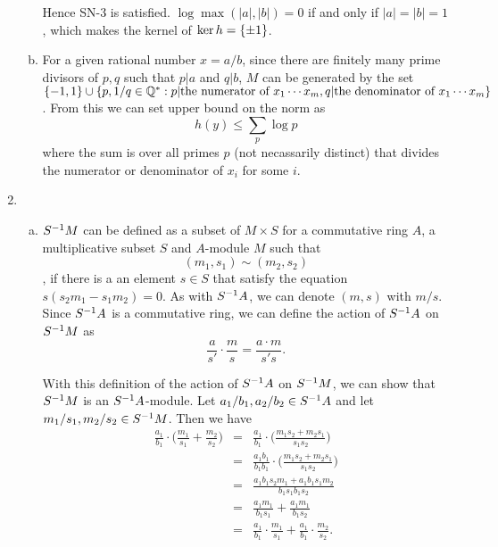 \documentclass{article}
\theoremstyle{definition}
\theoremstyle{remark}
\begin{document}
\begin{enumerate}[(1)]
\begin{enumerate}[(a)]
        \newcommand{\QQ}{\mathbb{Q}}
            Hence SN-3 is satisfied. $\log \max(|a|, |b|) = 0$ if and only if $|a| = |b| = 1$, which makes the kernel of $\ker h = \{\pm 1\}$.
          \item  For a given rational number $x = a/b$, since there are finitely many prime divisors of $p, q$ such that $p | a$ and $q | b$, $M$ can be generated by the set $\set{-1, 1} \cup \set{p, 1/q \in \QQ^* : p | \text{the numerator of } x_1 \cdots x_m, q | \text{the denominator of } x_1 \cdots x_m }$. From this we can set upper bound on the norm as
                $$h(y) \leq \sum_{p} \log p$$
          where the sum is over all primes $p$ (not necassarily distinct) that divides the numerator or denominator of $x_i$ for some $i$.
       \end{enumerate}
  \item
        \begin{enumerate}[(a)]
          \item ${S}^{-1}M$ can be defined as a subset of $M \times S$  for a commutative ring $A$, a multiplicative subset $S$ and $A$-module $M$ such that
                $$(m_1, s_1) \sim (m_2, s_2)$$,
                if there is a an element $s \in S$ that satisfy the equation $s(s_2m_1 - s_1m_2) = 0$. As with ${S}^{-1}A$, we can denote $(m, s)$ with $m/s.$
                Since ${S}^{-1}A$ is a commutative ring, we can define the action of ${S}^{-1}A$ on ${S}^{-1}M$ as
                $$\frac{a}{s'}\cdot \frac{m}s = \frac{a \cdot m}{s' s}.$$

                With this definition of the action of ${S}^{-1}A$  on ${S}^{-1}M$, we can show that ${S}^{-1}M$ is an ${S}^{-1}A$-module. Let $a_1/b_1, a_2/b_2 \in {S}^{-1}A$ and let $m_1/s_1, m_2/s_2 \in {S}^{-1}M$. Then we have
                \begin{eqnarray*}
                  \frac{a_1}{b_1} \cdot \bigg( \frac{m_1}{s_1} + \frac{m_2}{s_2}  \bigg) & = &  \frac{a_1}{b_1} \cdot \bigg( \frac{m_1s_2 + m_2s_1}{s_1s_2} \bigg)\\
                                                                                          & = & \frac{a_1b_1}{b_1b_1} \cdot \bigg(\frac {m_1s_2 + m_2s_1}{s_1s_2} \bigg) \\
                                                                                          & = &  \frac{a_1b_1s_2m_1 + a_1b_1s_1m_2}{b_1s_1b_1s_2} \\
                                                                                          & = &  \frac{a_1m_1}{b_1s_1} + \frac{a_1m_1}{b_1s_2} \\
                                                                                          & = &  \frac{a_1}{b_1}\cdot \frac{m_1}{s_1} + \frac{a_1}{b_1}\cdot \frac{m_2}{s_2}.  \\
                \end{eqnarray*}


\end{enumerate}
\end{enumerate}
\end{document}
